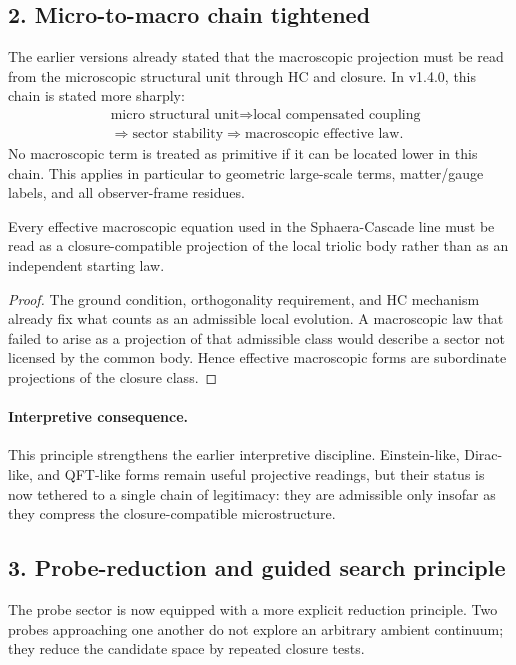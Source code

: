 \subsection*{2. Micro-to-macro chain tightened}
The earlier versions already stated that the macroscopic projection must be read
from the microscopic structural unit through HC and closure. In v1.4.0,
this chain is stated more sharply:
\[
\begin{aligned}
&\text{micro structural unit} \Longrightarrow \text{local compensated coupling}\\
&\Longrightarrow \text{sector stability} \Longrightarrow \text{macroscopic effective law}.
\end{aligned}
\]
No macroscopic term is treated as primitive if it can be located lower in this
chain. This applies in particular to geometric large-scale terms, matter/gauge
labels, and all observer-frame residues.

\begin{proposition}
\label{prop:micro-to-macro}
Every effective macroscopic equation used in the Sphaera-Cascade line must be
read as a closure-compatible projection of the local triolic body rather than
as an independent starting law.
\end{proposition}

\begin{proof}
The ground condition, orthogonality requirement, and HC mechanism already fix
what counts as an admissible local evolution. A macroscopic law that failed to
arise as a projection of that admissible class would describe a sector not
licensed by the common body. Hence effective macroscopic forms are subordinate
projections of the closure class.
\end{proof}

\paragraph{Interpretive consequence.}
This principle strengthens the earlier interpretive discipline. Einstein-like,
Dirac-like, and QFT-like forms remain useful projective readings, but their
status is now tethered to a single chain of legitimacy: they are admissible
only insofar as they compress the closure-compatible microstructure.

\subsection*{3. Probe-reduction and guided search principle}
The probe sector is now equipped with a more explicit reduction principle. Two
probes approaching one another do not explore an arbitrary ambient continuum;
they reduce the candidate space by repeated closure tests.

